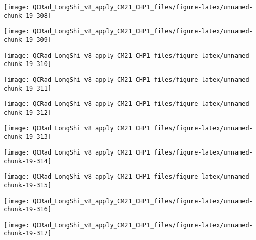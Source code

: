 \documentclass[
  10pt,
  a4paper,oneside]{article}
\begin{document}
\begin{center}\texttt{[image: QCRad\_LongShi\_v8\_apply\_CM21\_CHP1\_files/figure-latex/unnamed-chunk-19-308]} \end{center}

\begin{center}\texttt{[image: QCRad\_LongShi\_v8\_apply\_CM21\_CHP1\_files/figure-latex/unnamed-chunk-19-309]} \end{center}

\begin{center}\texttt{[image: QCRad\_LongShi\_v8\_apply\_CM21\_CHP1\_files/figure-latex/unnamed-chunk-19-310]} \end{center}

\begin{center}\texttt{[image: QCRad\_LongShi\_v8\_apply\_CM21\_CHP1\_files/figure-latex/unnamed-chunk-19-311]} \end{center}

\begin{center}\texttt{[image: QCRad\_LongShi\_v8\_apply\_CM21\_CHP1\_files/figure-latex/unnamed-chunk-19-312]} \end{center}

\begin{center}\texttt{[image: QCRad\_LongShi\_v8\_apply\_CM21\_CHP1\_files/figure-latex/unnamed-chunk-19-313]} \end{center}

\begin{center}\texttt{[image: QCRad\_LongShi\_v8\_apply\_CM21\_CHP1\_files/figure-latex/unnamed-chunk-19-314]} \end{center}

\begin{center}\texttt{[image: QCRad\_LongShi\_v8\_apply\_CM21\_CHP1\_files/figure-latex/unnamed-chunk-19-315]} \end{center}

\begin{center}\texttt{[image: QCRad\_LongShi\_v8\_apply\_CM21\_CHP1\_files/figure-latex/unnamed-chunk-19-316]} \end{center}

\begin{center}\texttt{[image: QCRad\_LongShi\_v8\_apply\_CM21\_CHP1\_files/figure-latex/unnamed-chunk-19-317]} \end{center}
\end{document}
